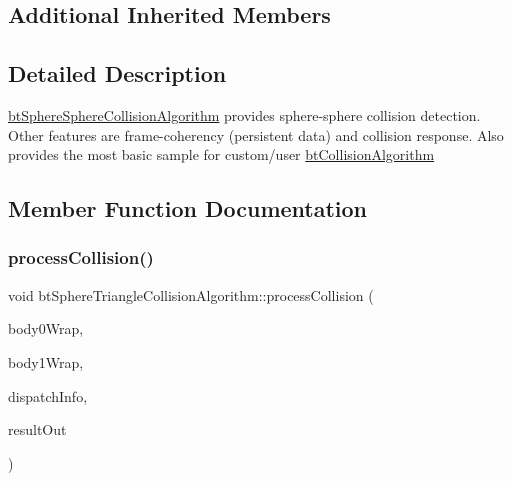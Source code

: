 \subsection*{Additional Inherited Members}


\subsection{Detailed Description}
\hyperlink{classbtSphereSphereCollisionAlgorithm}{bt\+Sphere\+Sphere\+Collision\+Algorithm} provides sphere-\/sphere collision detection. Other features are frame-\/coherency (persistent data) and collision response. Also provides the most basic sample for custom/user \hyperlink{classbtCollisionAlgorithm}{bt\+Collision\+Algorithm} 

\subsection{Member Function Documentation}
\mbox{\label{classbtSphereTriangleCollisionAlgorithm_af6de517d0a45abb91df4f61c5867c8f1}} 
\subsubsection{\texorpdfstring{process\+Collision()}{processCollision()}}
{\footnotesize\ttfamily void bt\+Sphere\+Triangle\+Collision\+Algorithm\+::process\+Collision (\begin{DoxyParamCaption}\item[{const \hyperlink{structbtCollisionObjectWrapper}{bt\+Collision\+Object\+Wrapper} $\ast$}]{body0\+Wrap,  }\item[{const \hyperlink{structbtCollisionObjectWrapper}{bt\+Collision\+Object\+Wrapper} $\ast$}]{body1\+Wrap,  }\item[{const \hyperlink{structbtDispatcherInfo}{bt\+Dispatcher\+Info} \&}]{dispatch\+Info,  }\item[{\hyperlink{classbtManifoldResult}{bt\+Manifold\+Result} $\ast$}]{result\+Out }\end{DoxyParamCaption})\hspace{0.3cm}{\ttfamily [virtual]}}

